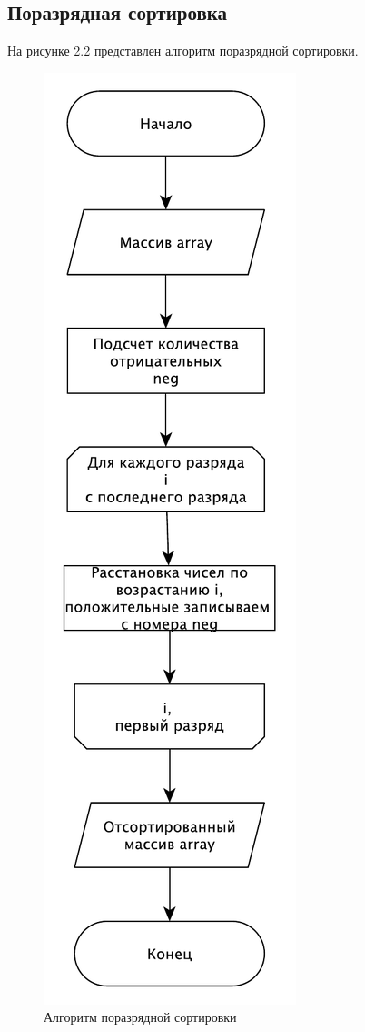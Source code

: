 \subsection{Поразрядная сортировка}
На рисунке 2.2 представлен алгоритм поразрядной сортировки.
\begin{figure}
\centering
\includegraphics[scale=0.8]{./pictures/shema1.pdf}
\caption{Алгоритм поразрядной сортировки}
\end{figure}
\newpage
